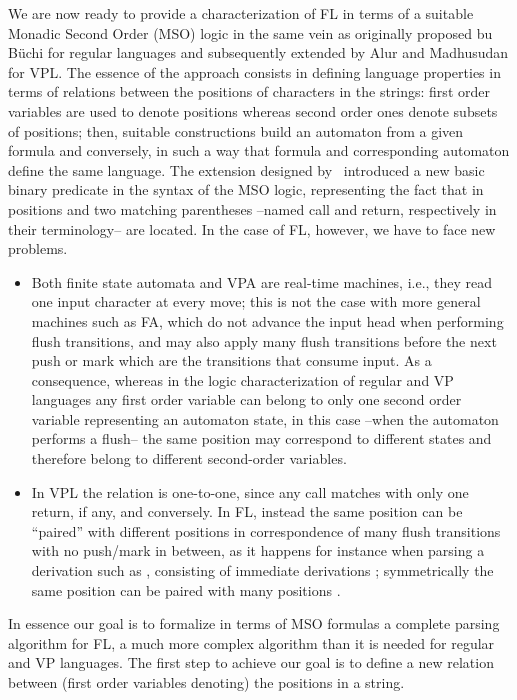 \documentclass[10pt,a4paper,runningheads]{llncs}
\begin{document}
We are now ready to provide a characterization of FL in terms of a
suitable Monadic Second Order (MSO) logic in the same vein as
originally proposed bu B\"uchi for regular languages and subsequently
extended by Alur and Madhusudan for VPL. The essence of the approach
consists in defining language properties in terms of relations between
the positions of characters in the strings: first order variables are
used to denote positions whereas second order ones denote subsets of
positions; then, suitable constructions build an automaton from a
given formula and conversely, in such a way that formula and
corresponding automaton define the same language.  The extension
designed by~\cite{jacm/AlurM09} introduced a new basic binary predicate
 in the syntax of the MSO logic,  representing
the fact that in positions  and  two matching parentheses
--named call and return, respectively in their terminology-- are
located.  In the case of FL, however, we have to face new problems.
\begin{itemize}
\item Both finite state automata and VPA are real-time machines, i.e.,
  they read one input character at every move; this is not the case
  with more general machines such as FA, which do not advance the
  input head when performing flush transitions, and may also apply
  many flush transitions before the next push or mark which are the
  transitions that consume input. As a consequence, whereas in the
  logic characterization of regular and VP languages any first order
  variable can belong to only one second order variable representing
  an automaton state, in this case --when the automaton performs a
  flush-- the same position may correspond to different states and
  therefore belong to different second-order variables.
\item In VPL the  relation is one-to-one, since any call
  matches with only one return, if any, and conversely. In FL, instead
  the same position  can be ``paired'' with different positions 
  in correspondence of many flush transitions with no push/mark in
  between, as it happens for instance when parsing a derivation such
  as , consisting of  immediate
  derivations ; symmetrically the same
  position  can be paired with many positions .
\end{itemize}
In essence our goal is to formalize in terms of MSO formulas a
complete parsing algorithm for FL, a much more complex algorithm than
it is needed for regular and VP languages.  The first step to achieve
our goal is to define a new relation between (first order variables
denoting) the positions in a string.
\end{document}
